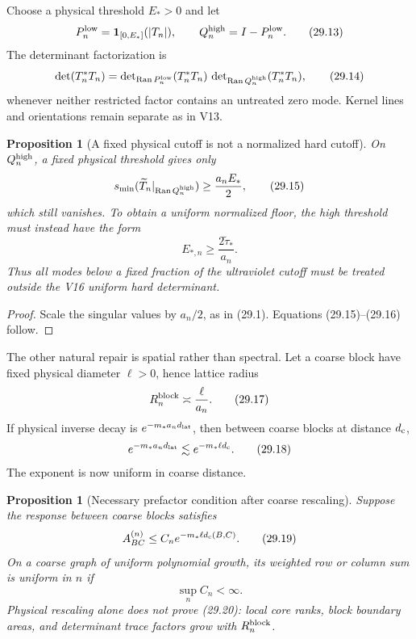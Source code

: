 \documentclass[11pt]{article}
\newtheorem{proposition}[theorem]{Proposition}
\theoremstyle{remark}
\begin{document}
Choose a physical threshold \(E_*>0\) and let
\[
 P_n^{\rm low}
 =
 {\bf 1}_{[0,E_*]}(|T_n|),\qquad
 Q_n^{\rm high}=I-P_n^{\rm low}.                           \tag{29.13}
\]
The determinant factorization is
\[
 \det(T_n^*T_n)
 =
 \det\nolimits_{\operatorname{Ran}P_n^{\rm low}}(T_n^*T_n)
 \,
 \det\nolimits_{\operatorname{Ran}Q_n^{\rm high}}(T_n^*T_n),
                                                               \tag{29.14}
\]
whenever neither restricted factor contains an untreated zero mode.
Kernel lines and orientations remain separate as in V13.

\begin{proposition}[A fixed physical cutoff is not a normalized
hard cutoff]
\label{prop:v15v29-fixed-cutoff}
On \(Q_n^{\rm high}\), a fixed physical threshold gives only
\[
 s_{\min}(\widetilde T_n|_{\operatorname{Ran}Q_n^{\rm high}})
 \ge\frac{a_nE_*}{2},                                      \tag{29.15}
\]
which still vanishes.  To obtain a uniform normalized floor, the
high threshold must instead have the form
\[
 E_{*,n}\ge\frac{2\widetilde\tau_*}{a_n}.                  \tag{29.16}
\]
Thus all modes below a fixed fraction of the ultraviolet cutoff
must be treated outside the V16 uniform hard determinant.
\end{proposition}

\begin{proof}
Scale the singular values by \(a_n/2\), as in (29.1).
Equations (29.15)--(29.16) follow.
\end{proof}

The other natural repair is spatial rather than spectral.  Let a
coarse block have fixed physical diameter \(\ell>0\), hence lattice
radius
\[
 R_n^{\rm block}\asymp\frac{\ell}{a_n}.                     \tag{29.17}
\]
If physical inverse decay is \(e^{-m_*a_nd_{\rm lat}}\), then between
coarse blocks at distance \(d_{\rm c}\),
\[
 e^{-m_*a_nd_{\rm lat}}
 \lesssim e^{-m_*\ell d_{\rm c}}.                          \tag{29.18}
\]
The exponent is now uniform in coarse distance.

\begin{proposition}[Necessary prefactor condition after coarse
rescaling]
\label{prop:v15v29-coarse}
Suppose the response between coarse blocks satisfies
\[
 A_{BC}^{(n)}
 \le C_n e^{-m_*\ell d_{\rm c}(B,C)}.                      \tag{29.19}
\]
On a coarse graph of uniform polynomial growth, its weighted row or
column sum is uniform in \(n\) if
\[
 \sup_n C_n<\infty.                                        \tag{29.20}
\]
Physical rescaling alone does not prove (29.20): local core ranks,
block boundary areas, and determinant trace factors grow with
\(R_n^{\rm block}\).
\end{proposition}
\end{document}
